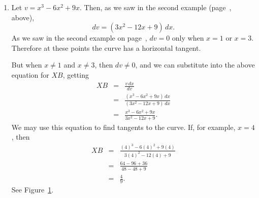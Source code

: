 \documentclass[twoside,openright]{article}
\newlength{\oldjot}
\begin{document}
\begin{enumerate}
\item Let $v = x^3 - 6x^2 + 9x.$ Then, as we saw in the second example (page~\pageref{ex2}, above),
$$dv = (3x^2 - 12x + 9)\,dx.$$
As we saw in the second example on page~\pageref{minex3}, $dv=0$ only when $x=1$ or $x=3$.  Therefore at these points the curve has a horizontal tangent.


But when $x \neq 1$ and $x \neq 3$, then $dv \neq 0$, and we can substitute into the above equation for $XB$, getting
\begin{eqnarray*}
XB & = & \frac{v\, dx}{dv}\\
& = & \frac{(x^3 - 6x^2 +9x)\,dx}{(3x^2 -12x +9)\,dx}\\
& = & \frac{x^3 - 6x^2 + 9x}{3x^2 - 12x + 9}.
\end{eqnarray*}
We may use this equation to find tangents to the curve.  If, for example, $x=4$, then
\begin{eqnarray*}
XB & = & \frac{(4)^3 - 6(4)^2 + 9(4)}{3(4)^2 - 12(4) + 9} \\
& = & \frac{64 - 96 + 36}{48 - 48 + 9}\\ 
& = & \frac{4}{9}.
\end{eqnarray*}
See Figure~\ref{tangex2}.
\begin{figure}[htp]
\begin{center}
\caption{}
\label{tangex2}
\vspace{-10pt}
\end{center}
\end{figure}

\end{enumerate}
\setlength{\jot}{\oldjot}
\end{document}
